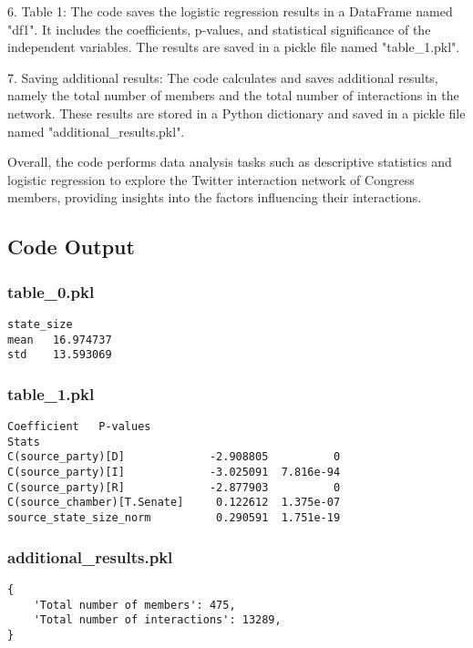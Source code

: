 \documentclass[11pt]{article}
\begin{document}
6. Table 1: The code saves the logistic regression results in a DataFrame named "df1". It includes the coefficients, p-values, and statistical significance of the independent variables. The results are saved in a pickle file named "table\_1.pkl".

7. Saving additional results: The code calculates and saves additional results, namely the total number of members and the total number of interactions in the network. These results are stored in a Python dictionary and saved in a pickle file named "additional\_results.pkl".

Overall, the code performs data analysis tasks such as descriptive statistics and logistic regression to explore the Twitter interaction network of Congress members, providing insights into the factors influencing their interactions.

\subsection{Code Output}

\subsubsection*{table\_0.pkl}

\begin{Verbatim}[tabsize=4]
      state_size
mean   16.974737
std    13.593069
\end{Verbatim}

\subsubsection*{table\_1.pkl}

\begin{Verbatim}[tabsize=4]
                             Coefficient   P-values
Stats
C(source_party)[D]             -2.908805          0
C(source_party)[I]             -3.025091  7.816e-94
C(source_party)[R]             -2.877903          0
C(source_chamber)[T.Senate]     0.122612  1.375e-07
source_state_size_norm          0.290591  1.751e-19
\end{Verbatim}

\subsubsection*{additional\_results.pkl}

\begin{Verbatim}[tabsize=4]
{
    'Total number of members': 475,
    'Total number of interactions': 13289,
}
\end{Verbatim}
\end{document}
